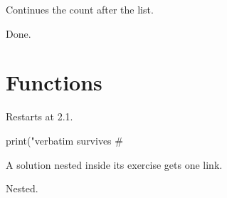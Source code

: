 \documentclass[solutions=chapter]{akizumi-book}
\begin{document}
\begin{exercise}
Continues the count after the list.
\end{exercise}
\begin{solution}
Done.
\end{solution}

\chapter{Functions}
\begin{exercise}
Restarts at 2.1.
\end{exercise}
\begin{solution}
\begin{codeblock}[lang=Python]
print("verbatim survives # %
\end{codeblock}
\end{solution}
\begin{exercise}
A solution nested inside its exercise gets one link.
\begin{solution}
Nested.
\end{solution}
\end{exercise}
\end{document}
